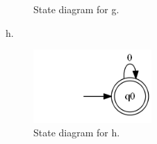 \documentclass[10pt] {article}
\begin{document}
\begin{enumerate}
\begin{figure}[H]
\caption{State diagram for g.}
\label{8}
\end{figure} 
h.
\begin{figure}[H]
\includegraphics[width=0.4\textwidth]{h7.png}
\caption{State diagram for h.}
\label{8}
\end{figure} 
\end{enumerate}
\end{document}
